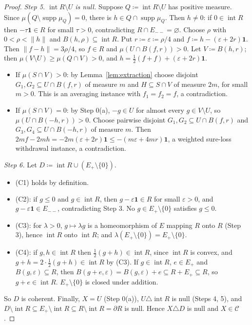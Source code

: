 \documentclass[11pt]{article}
\theoremstyle{definition}
\newcommand{\C}{\mathcal C}
\newcommand{\one}{\mathbf 1}
\newcommand{\supp}{\operatorname{supp}}
\newcommand{\interior}{\operatorname{int}}
\newcommand{\bd}{\partial}
\begin{document}
\begin{proof}
\emph{Step 5. $\interior R\setminus U$ is null.} Suppose $Q\coloneqq\interior R\setminus U$ has positive measure. Since $\mu(Q\setminus\supp\mu_Q)=0$, there is $h\in Q\cap\supp\mu_Q$. Then $h\ne0$: if $0\in\interior R$ then $-\tau\one\in R$ for small $\tau>0$, contradicting $R\cap E_{--}=\varnothing$. Choose $\rho$ with $0<\rho<\|h\|$ and $B(h,\rho)\subseteq\interior R$. Put $r\coloneqq\varepsilon\coloneqq\rho/4$ and $f\coloneqq h-(\varepsilon+2r)\one$. Then $\|f-h\|=3\rho/4$, so $f\in R$ and $\mu(U\cap B(f,r))>0$. Let $V\coloneqq B(h,r)$; then $\mu(V\setminus U)\ge\mu(Q\cap V)>0$, and $h=\frac12(f+f)+(\varepsilon+2r)\one$.
\begin{itemize}
\item If $\mu(S\cap V)>0$: by Lemma~\ref{lem:extraction} choose disjoint $G_1,G_2\subseteq U\cap B(f,r)$ of measure $m$ and $H\subseteq S\cap V$ of measure $2m$, for small $m>0$. This is an averaging instance with $f_1=f_2=f$, a contradiction.
\item If $\mu(S\cap V)=0$: by Step 0(a), $-g\in U$ for almost every $g\in V\setminus U$, so $\mu(U\cap B(-h,r))>0$. Choose pairwise disjoint $G_1,G_2\subseteq U\cap B(f,r)$ and $G_3,G_4\subseteq U\cap B(-h,r)$ of measure $m$. Then $2mf-2mh=-2m(\varepsilon+2r)\one\le-(m\varepsilon+4mr)\one$, a weighted sure-loss withdrawal instance, a contradiction.
\end{itemize}

\emph{Step 6.} Let $D\coloneqq\interior R\cup(E_+\setminus\{0\})$.
\begin{itemize}
\item (C1) holds by definition.
\item (C2): if $g\le0$ and $g\in\interior R$, then $g-\varepsilon\one\in R$ for small $\varepsilon>0$, and $g-\varepsilon\one\in E_{--}$, contradicting Step 3. No $g\in E_+\setminus\{0\}$ satisfies $g\le0$.
\item (C3): for $\lambda>0$, $g\mapsto\lambda g$ is a homeomorphism of $E$ mapping $R$ onto $R$ (Step 3), hence $\interior R$ onto $\interior R$; and $\lambda(E_+\setminus\{0\})=E_+\setminus\{0\}$.
\item (C4): if $g,h\in\interior R$ then $\frac12(g+h)\in\interior R$, since $\interior R$ is convex, and $g+h=2\cdot\frac12(g+h)\in\interior R$ by (C3). If $g\in\interior R$, $e\in E_+$ and $B(g,\varepsilon)\subseteq R$, then $B(g+e,\varepsilon)=B(g,\varepsilon)+e\subseteq R+E_+\subseteq R$, so $g+e\in\interior R$. $E_+\setminus\{0\}$ is closed under addition.
\end{itemize}
So $D$ is coherent. Finally, $X=U$ (Step 0(a)), $U\triangle\interior R$ is null (Steps 4, 5), and $D\setminus\interior R\subseteq E_+\setminus\interior R\subseteq R\setminus\interior R=\bd R$ is null. Hence $X\triangle D$ is null and $X\in\C$.
\end{proof}
\end{document}
